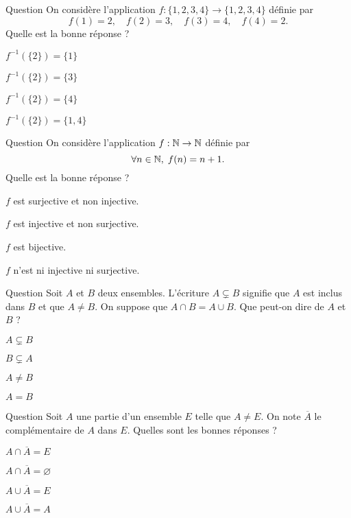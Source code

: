\begin{multi}[multiple,feedback=
{L'ensemble \(f^{-1}(\{2\})\) est formé des éléments qui ont une image égale à \(2\).
}]{Question}
On considère l'application \(f:\{1,2,3,4\}\to \{1,2,3,4\}\) définie par
\[f(1)=2,\quad f(2)=3,\quad f(3)=4,\quad f(4)=2.\]
Quelle est la bonne réponse ?

    \item \(f^{-1}(\{2\})=\{1\}\)
    \item \(f^{-1}(\{2\})=\{3\}\)
    \item \(f^{-1}(\{2\})=\{4\}\)
    \item* \(f^{-1}(\{2\})=\{1,4\}\)
\end{multi}


\begin{multi}[multiple,feedback=
{Si \(f(n_1)=f(n_2)\) alors \(n_1=n_2\), donc \(f\) est injective. Par contre, \(f(n)=0\) n'a pas de solution dans \(\Nn\). Donc \(f\) n'est pas surjective.
}]{Question}
On considère l'application \(f:\mathbb{N}\to \mathbb{N}\) définie par
\[\forall n\in \mathbb{N},\; f(n)=n+1.\]
Quelle est la bonne réponse ?

    \item \(f\) est surjective et non injective.
    \item* \(f\) est injective et non surjective.
    \item \(f\) est bijective.
    \item \(f\) n'est ni injective ni surjective.
\end{multi}


\begin{multi}[multiple,feedback=
{Si \(A\cap B=A\cup B\) alors \(A\subset A\cup B=A \cap B\subset B\), c'est-à-dire \(A\subset B\). On vérifie de même que \(B\subset A\). Donc \(A=B\).
}]{Question}
Soit \(A\) et \(B\) deux ensembles. L'écriture \(A\varsubsetneq B\) signifie que \(A\) est inclus dans \(B\) et que \(A\neq B\). On suppose que \(A\cap B=A\cup B\). Que peut-on dire de \(A\) et \(B\) ?

    \item \(A\varsubsetneq B\)
    \item \(B\varsubsetneq A\)
    \item \(A\neq B\)
    \item* \(A=B\)
\end{multi}


\begin{multi}[multiple,feedback=
{S'il existe \(x\in E\) tel que \(x\in A\cap \overline{A}\) alors \((x\in A\) et \(x\notin A)\). Ceci est absurde. Donc \(A\cap \overline{A}=\varnothing\). De même \(x\in E\Rightarrow (x\in A\) ou \(x\notin A)\). Donc que \(E\subset A\cup\overline{A}\subset E\).
}]{Question}
Soit \(A\) une partie d'un ensemble \(E\) telle que \(A\neq E\). On note \(\overline{A}\) le complémentaire de \(A\) dans \(E\). Quelles sont les bonnes réponses ?

    \item \(A\cap \overline{A}=E\)
    \item* \(A\cap \overline{A}=\varnothing\)
    \item* \(A\cup\overline{A}=E\)
    \item \(A\cup \overline{A}=A\)
\end{multi}


